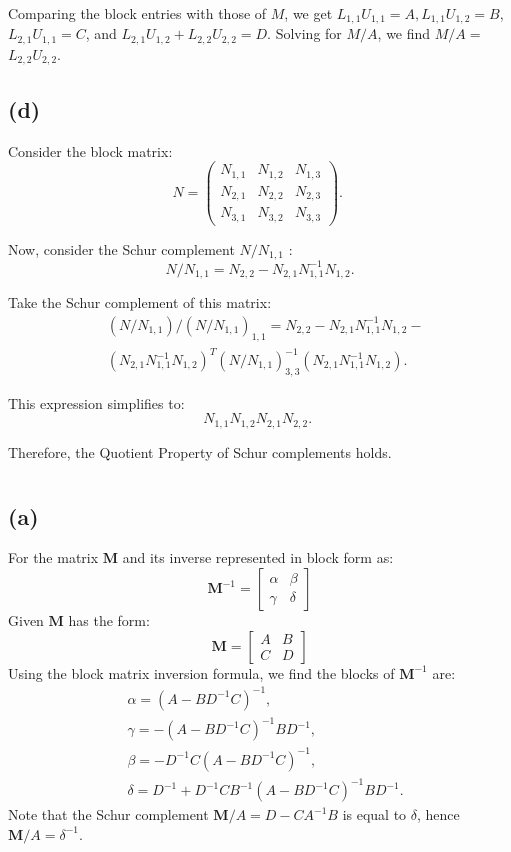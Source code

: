 \documentclass{article}
\begin{document}
Comparing the block entries with those of $M$, we get $L_{1,1} U_{1,1}=A, L_{1,1} U_{1,2}=B$, $L_{2,1} U_{1,1}=C$, and $L_{2,1} U_{1,2}+L_{2,2} U_{2,2}=D$. Solving for $M / A$, we find $M / A=$ $L_{2,2} U_{2,2}$.
\subsection{(d)}
Consider the block matrix:
$$
N=\left(\begin{array}{lll}
N_{1,1} & N_{1,2} & N_{1,3} \\
N_{2,1} & N_{2,2} & N_{2,3} \\
N_{3,1} & N_{3,2} & N_{3,3}
\end{array}\right) \text {. }
$$

Now, consider the Schur complement $N / N_{1,1}$ :
$$
N / N_{1,1}=N_{2,2}-N_{2,1} N_{1,1}^{-1} N_{1,2} .
$$

Take the Schur complement of this matrix:
$$
\begin{aligned}
& \left(N / N_{1,1}\right) /\left(N / N_{1,1}\right)_{1,1}=N_{2,2}-N_{2,1} N_{1,1}^{-1} N_{1,2}- \\
& \left(N_{2,1} N_{1,1}^{-1} N_{1,2}\right)^T\left(N / N_{1,1}\right)_{3,3}^{-1}\left(N_{2,1} N_{1,1}^{-1} N_{1,2}\right) .
\end{aligned}
$$

This expression simplifies to:
$$
N_{1,1} N_{1,2} N_{2,1} N_{2,2} \text {. }
$$

Therefore, the Quotient Property of Schur complements holds.

\section{}
\subsection{(a)}
For the matrix $\boldsymbol{M}$ and its inverse represented in block form as:
\[
\boldsymbol{M}^{-1}=\left[\begin{array}{cc}
\alpha & \beta \\
\gamma & \delta
\end{array}\right]
\]
Given $\boldsymbol{M}$ has the form:
\[
\boldsymbol{M}=\left[\begin{array}{cc}
A & B \\
C & D
\end{array}\right]
\]
Using the block matrix inversion formula, we find the blocks of $\boldsymbol{M}^{-1}$ are:
\[
\begin{aligned}
&\alpha=\left(A-BD^{-1}C\right)^{-1},\\
&\gamma=-\left(A-BD^{-1}C\right)^{-1}BD^{-1},\\
&\beta=-D^{-1}C\left(A-BD^{-1}C\right)^{-1},\\
&\delta=D^{-1}+D^{-1}CB^{-1}\left(A-BD^{-1}C\right)^{-1}BD^{-1}.
\end{aligned}
\]
Note that the Schur complement $\boldsymbol{M}/A=D-CA^{-1}B$ is equal to $\delta$, hence $\boldsymbol{M}/A=\delta^{-1}$.
\end{document}
